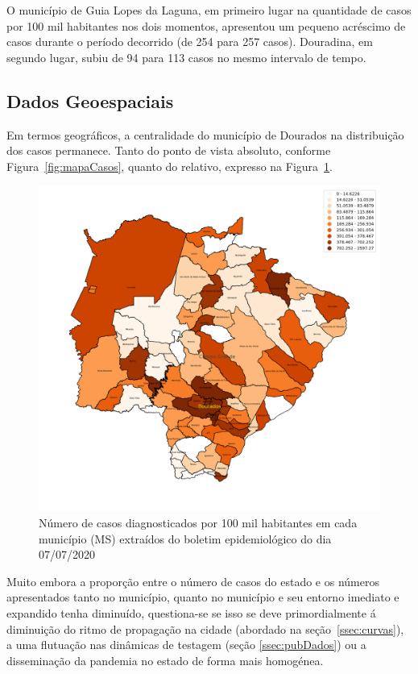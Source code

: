 \documentclass[12pt]{article}
\begin{document}
O município de Guia Lopes da Laguna, em primeiro lugar na quantidade de casos por 100 mil habitantes nos dois momentos, apresentou um pequeno acréscimo de casos durante o período decorrido (de 254 para 257 casos). Douradina, em segundo lugar, subiu de 94 para 113 casos no mesmo intervalo de tempo. 

\subsection{Dados Geoespaciais}\label{ssec:geo}

Em termos geográficos, a centralidade do município de Dourados na distribuição dos casos permanece. Tanto do ponto de vista absoluto, conforme Figura~\ref{fig:mapaCasos}, quanto do relativo, expresso na Figura~\ref{fig:mapa100K}.

\begin{figure}[!htb]
  \centering
  \includegraphics[width=.8\textwidth]{figs/mapa_casos_100_mil.png}
  \caption{Número de casos diagnosticados por 100 mil habitantes em cada município (MS) extraídos do boletim epidemiológico do dia 07/07/2020}
  \label{fig:mapa100K}
  \end{figure}

Muito embora a proporção entre o número de casos do estado e os números apresentados tanto no município, quanto no município e seu entorno imediato e expandido tenha diminuído, questiona-se se isso se deve primordialmente á diminuição do ritmo de propagação na cidade (abordado na seção~\ref{ssec:curvas}), a uma flutuação nas dinâmicas de testagem (seção \ref{ssec:pubDados}) ou a disseminação da pandemia no estado de forma mais homogénea.
\end{document}
